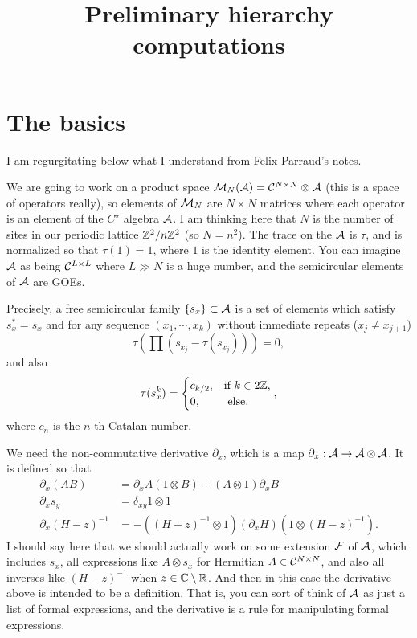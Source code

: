 \documentclass[11pt]{amsart}
\title{Preliminary hierarchy computations}
\begin{document}
\maketitle

\section{The basics}
I am regurgitating below what I understand from Felix Parraud's notes.

We are going to work on a product space
${\mathcal{M}}_N({\mathcal{A}}) = {\mathcal{C}}^{N\times N} \otimes {\mathcal{A}}$ (this is a space
of operators really), so elements of ${\mathcal{M}}_N$ are $N\times N$ matrices where
each operator is an element of the $C^\star$ algebra ${\mathcal{A}}$.  I am thinking here
that $N$ is the number of sites in our periodic lattice ${\mathbb{Z}}^2/n{\mathbb{Z}}^2$ (so $N=n^2$).
The trace on the ${\mathcal{A}}$ is $\tau$, and is normalized so that $\tau(1)=1$,
where $1$ is the identity element.   You can imagine ${\mathcal{A}}$ as being ${\mathcal{C}}^{L\times L}$ where $L\gg N$ is a huge number, and the semicircular elements of
${\mathcal{A}}$ are GOEs.

Precisely, a free semicircular family $\{s_x\} \subset {\mathcal{A}}$ is a set of elements
which satisfy $s_x^* = s_x$ and for any sequence $(x_1,\cdots,x_k)$ without immediate
repeats ($x_j \not= x_{j+1}$)
\[
\tau(\prod (s_{x_j} - \tau(s_{x_j}))) = 0,
\]
and also
\[
\tau(s_x^k) = \begin{cases} c_{k/2}, &\text{if }k\in2{\mathbb{Z}}, \\ 0, &\text{ else.}\end{cases},
\]
where $c_n$ is the $n$-th Catalan number.

We need the non-commutative derivative $\partial_x$, which is a map
$\partial_x: {\mathcal{A}}\to {\mathcal{A}}\otimes {\mathcal{A}}$.  It is defined so that
\begin{align*}
\partial_x(AB) &= \partial_x A (1\otimes B) + (A\otimes 1) \partial_x B \\
\partial_x s_y &= \delta_{xy} 1\otimes 1 \\
\partial_x (H-z)^{-1} &= - ((H-z)^{-1} \otimes 1) (\partial_x H) (1\otimes (H-z)^{-1}).
\end{align*}
I should say here that we should actually work on some extension ${\mathcal{F}}$ of ${\mathcal{A}}$, which includes $s_x$, all expressions like $A\otimes s_x$ for Hermitian $A\in{\mathcal{C}}^{N\times N}$, and also all inverses like $(H-z)^{-1}$ when $z\in{\mathbb C}\setminus {\mathbb{R}}$.  And then in this case the derivative above is intended to
be a definition.  That is, you can sort of think of ${\mathcal{A}}$ as just a list of
formal expressions, and the derivative is a rule for manipulating formal expressions.
\end{document}
